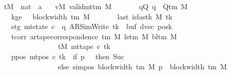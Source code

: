 \begin{isabellebody}
\ \ \ \ \ tM\ {\isacharcolon}{\kern0pt}{\isacharcolon}{\kern0pt}\ {\isachardoublequoteopen}nat\ {\isasymRightarrow}\ {\isacharprime}{\kern0pt}a{\isachardoublequoteclose}\isanewline
\ \ \ vM{\isacharcolon}{\kern0pt}\ {\isachardoublequoteopen}valid{\isacharunderscore}{\kern0pt}mttm\ M{\isachardoublequoteclose}\isanewline
\ \ \ \ \ \ \ qQ{\isacharcolon}{\kern0pt}\ {\isachardoublequoteopen}q\ {\isasymin}\ Q{\isacharunderscore}{\kern0pt}tm\ M{\isachardoublequoteclose}\isanewline
\ \ \ \ \ \ \ kge{}{\isacharcolon}{\kern0pt}\ {\isachardoublequoteopen}{}\ {\isasymle}\ block{\isacharunderscore}{\kern0pt}width\ {\isacharparenleft}{\kern0pt}{\isasymGamma}{\isacharunderscore}{\kern0pt}tm\ M{\isacharparenright}{\kern0pt}{\isachardoublequoteclose}\isanewline
\ \ \ \ \ \ \ last{\isacharcolon}{\kern0pt}\ {\isachardoublequoteopen}is{\isacharunderscore}{\kern0pt}last{\isacharunderscore}{\kern0pt}k\ M\ tk{\isachardoublequoteclose}\isanewline
\ \ \ \ \ \ \ stg{\isacharcolon}{\kern0pt}\ {\isachardoublequoteopen}mt{\isacharunderscore}{\kern0pt}state\ c{\isacharprime}{\kern0pt}\ {\isacharequal}{\kern0pt}\ {\isacharparenleft}{\kern0pt}q{\isacharcomma}{\kern0pt}\ AR{\isacharunderscore}{\kern0pt}SimWrite{\isacharcomma}{\kern0pt}\ tk{\isacharcomma}{\kern0pt}\ {}{\isacharcomma}{\kern0pt}\ buf{\isacharcomma}{\kern0pt}\ dvec{\isacharcomma}{\kern0pt}\ posk{\isacharparenright}{\kern0pt}{\isachardoublequoteclose}\isanewline
\ \ \ \ \ \ \ tcorr{\isacharcolon}{\kern0pt}\ {\isachardoublequoteopen}ar{\isacharunderscore}{\kern0pt}tape{\isacharunderscore}{\kern0pt}correspondence\ {\isacharparenleft}{\kern0pt}{\isasymGamma}{\isacharunderscore}{\kern0pt}tm\ M{\isacharparenright}{\kern0pt}\ {\isacharparenleft}{\kern0pt}le{\isacharunderscore}{\kern0pt}tm\ M{\isacharparenright}{\kern0pt}\ {\isacharparenleft}{\kern0pt}bl{\isacharunderscore}{\kern0pt}tm\ M{\isacharparenright}{\kern0pt}\isanewline
\ \ \ \ \ \ \ \ \ \ \ \ \ \ \ \ \ \ \ \ tM\ {\isacharparenleft}{\kern0pt}mt{\isacharunderscore}{\kern0pt}tape\ c{\isacharprime}{\kern0pt}\ tk{\isacharparenright}{\kern0pt}{\isachardoublequoteclose}\isanewline
\ \ \ \ \ \ \ ppos{\isacharcolon}{\kern0pt}\ {\isachardoublequoteopen}mt{\isacharunderscore}{\kern0pt}pos\ c{\isacharprime}{\kern0pt}\ tk\ {\isacharequal}{\kern0pt}\ {\isacharparenleft}{\kern0pt}if\ p\ {\isacharequal}{\kern0pt}\ {}\ then\ Suc\ {}\isanewline
\ \ \ \ \ \ \ \ \ \ \ \ \ \ \ \ \ \ \ \ else\ sim{\isacharunderscore}{\kern0pt}pos\ {\isacharparenleft}{\kern0pt}block{\isacharunderscore}{\kern0pt}width\ {\isacharparenleft}{\kern0pt}{\isasymGamma}{\isacharunderscore}{\kern0pt}tm\ M{\isacharparenright}{\kern0pt}{\isacharparenright}{\kern0pt}\ p\ {\isacharplus}{\kern0pt}\ block{\isacharunderscore}{\kern0pt}width\ {\isacharparenleft}{\kern0pt}{\isasymGamma}{\isacharunderscore}{\kern0pt}tm\ M{\isacharparenright}{\kern0pt}{\isacharparenright}{\kern0pt}{\isachardoublequoteclose}\isanewline

\end{isabellebody}
